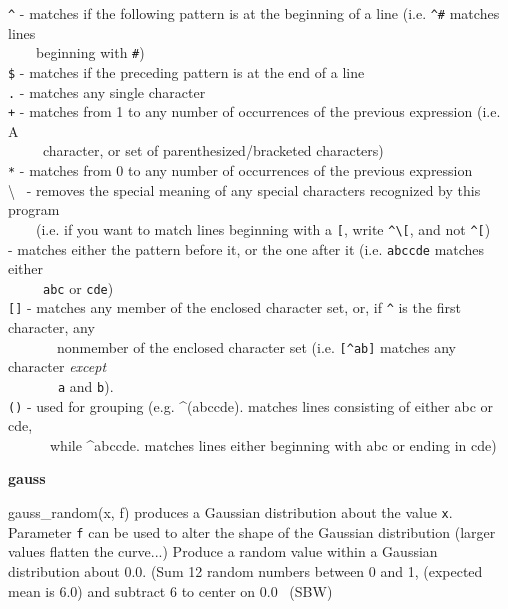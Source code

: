 \texttt{\^{}} - matches if the following pattern is at the beginning of
a line (i.e. \texttt{\^{}\#} matches lines \ \\
 \ \ \ \ beginning with
\texttt{{\textquotedbl}\#{\textquotedbl}})\\
\texttt{\$} - matches if the preceding pattern is at the end of a
line\\
\texttt{.} - matches any single character\\
\texttt{+} - matches from 1 to any number of occurrences of the previous
expression (i.e. A\\
 \ \ \ \ \ character, or set of parenthesized/bracketed
characters)\\
\texttt{*} - matches from 0 to any number of occurrences of the previous
expression\\
{\textbackslash} \ {}- removes the special meaning of any special
characters recognized by this program\\
 \ \ \ \ (i.e. if you want to match lines beginning with a
\texttt{{\textquotedbl}[{\textquotedbl}}, write
\texttt{\^{}{\textbackslash}[}, and not \texttt{\^{}[})\\
\texttt{{\textbar}} - matches either the pattern before it, or the one
after it (i.e. \texttt{abc{\textbar}cde} matches either\\
 \ \ \ \ \ \texttt{abc} or \texttt{cde})\\
\texttt{[]} - matches any member of the enclosed character set, or, if
\texttt{\^{}} is the first character, any\\
 \ \ \ \ \ \ \ nonmember of the enclosed character set (i.e.
\texttt{[\^{}ab]} matches any character \textit{except\\
 \ \ \ \ \ \ }\ \texttt{a} and \texttt{b}).\\
\texttt{()} - used for grouping (e.g. \^{}(abc{\textbar}cde). matches
lines consisting of either \textsf{{\textquotedbl}abc{\textquotedbl}}
or \textsf{{\textquotedbl}cde{\textquotedbl},}\\
 \ \ \ \ \ \ while \textsf{\^{}abc{\textbar}cde}. matches lines either
beginning with \textsf{{\textquotedbl}abc{\textquotedbl}} or ending in
\textsf{{\textquotedbl}cde{\textquotedbl}})

{\sffamily\bfseries
gauss}

\textsf{gauss\_random(x, f)} produces a Gaussian distribution about the value \texttt{x}.
Parameter \texttt{f} can be used to alter the shape of the Gaussian
distribution (larger values flatten the curve...) Produce a random
value within a Gaussian distribution about 0.0. (Sum 12 random numbers
between 0 and 1, (expected mean is 6.0) and subtract 6 to center on 0.0
\ (SBW)

